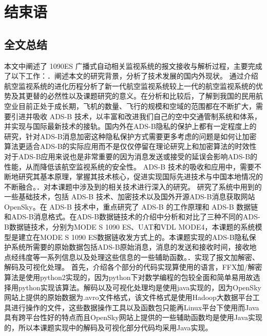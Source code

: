 
\chapter{结束语}

\section{全文总结}
本文中阐述了 1090ES 广播式自动相关监视系统的报文接收与解析过程，主要完成了以下工作：．阐述本文的研究背景，分析了技术发展的国内外现状。\newline 
通过介绍航空监视系统的进化历程分析了新一代航空监视系统较上一代的航空监视系统的优势及其更替的必然性以及课题研究的意义。在分析和比较后，了解到我国的民用航空业目前正处于成长期，飞机的数量、飞行的规模和空域的范围都在不断扩大，需要引进并吸收 ADS-B 技术，以丰富和改进我们自己的空中交通管制系统和体系，并实现与国际最新技术的接轨。国内外在ADS-B隐私的保护上都有一定程度上的研究，针对ADS-B消息加密这种隐私保护方式需要更多考虑的问题是如何让加密算法更适合ADS-B的实际应用而不是仅仅停留在理论研究上和加密算法的时效性对于ADS-B应用来说也是非常重要的因为消息发送或接受的延误会影响ADS-B的性能，从而降低该航空监视系统的安全性。 ADS-B 技术的吸收和应用中，需要不断地研究其基本原理，掌握其技术核心，促进实现国际先进技术与中国本地情况的不断融合。．对本课题中涉及到的相关技术进行深入的研究。\newline
研究了系统中用到的一些基础技术，包括 ADS-B 技术、加密技术以及国外开源ADS-B消息获取网站OpenSky。在 ADS-B 技术中，重点研究了 ADS-B 的工作原理和 ADS-B 数据链和ADS-B消息格式。在ADS-B数据链技术的介绍中分析和对比了三种不同的ADS-B数据链技术，分别为MODE S 1090 ES、UAT和VDL MODE4，本课题的系统模型是建立在MODE S 1090 ES数据链收发方式上的。本课题实现的ADS-B隐私保护系统所需要的原始数据包括ADS-B原始消息，消息的发送和接收时间，接收地点经纬度等一系列信息以及处理这些信息的一些辅助函数。．实现了报文加解密、解码及可视化处理。\newline 
首先，介绍各个部分的代码实现算使用的语言，FFX加/解密算法是使用python2实现的，因为python下对数学编程的包较全面和简单易用故选择用python实现该算法。解码以及可视化处理均是使用java实现的，因为OpenSky网站上提供的原始数据为.avro文件格式，该文件格式是使用Hadoop大数据平台工具进行操作的文件，这些数据操作工具以及函数包只能再Linux平台下使用而Java具有跨平台性好的特点而且OpenSky网站上提供的一些辅助函数均是使用Java实现的，所以本课题实现中的解码及可视化部分代码均采用Java实现。\newline
